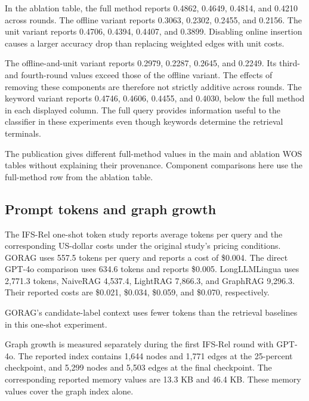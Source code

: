 

In the ablation table, the full method reports 0.4862, 0.4649, 0.4814, and 0.4210 across rounds. The offline variant reports 0.3063, 0.2302, 0.2455, and 0.2156. The unit variant reports 0.4706, 0.4394, 0.4407, and 0.3899. Disabling online insertion causes a larger accuracy drop than replacing weighted edges with unit costs.

The offline-and-unit variant reports 0.2979, 0.2287, 0.2645, and 0.2249. Its third- and fourth-round values exceed those of the offline variant. The effects of removing these components are therefore not strictly additive across rounds. The keyword variant reports 0.4746, 0.4606, 0.4455, and 0.4030, below the full method in each displayed column. The full query provides information useful to the classifier in these experiments even though keywords determine the retrieval terminals.

The publication gives different full-method values in the main and ablation WOS tables without explaining their provenance. Component comparisons here use the full-method row from the ablation table.

\subsection{Prompt tokens and graph growth}
\label{sec:gorag:resources}

The IFS-Rel one-shot token study reports average tokens per query and the corresponding US-dollar costs under the original study's pricing conditions. GORAG uses 557.5 tokens per query and reports a cost of \$0.004. The direct GPT-4o comparison uses 634.6 tokens and reports \$0.005. LongLLMLingua uses 2,771.3 tokens, NaiveRAG 4,537.4, LightRAG 7,866.3, and GraphRAG 9,296.3. Their reported costs are \$0.021, \$0.034, \$0.059, and \$0.070, respectively.



GORAG's candidate-label context uses fewer tokens than the retrieval baselines in this one-shot experiment.

Graph growth is measured separately during the first IFS-Rel round with GPT-4o. The reported index contains 1,644 nodes and 1,771 edges at the 25-percent checkpoint, and 5,299 nodes and 5,503 edges at the final checkpoint. The corresponding reported memory values are 13.3 KB and 46.4 KB. These memory values cover the graph index alone.

